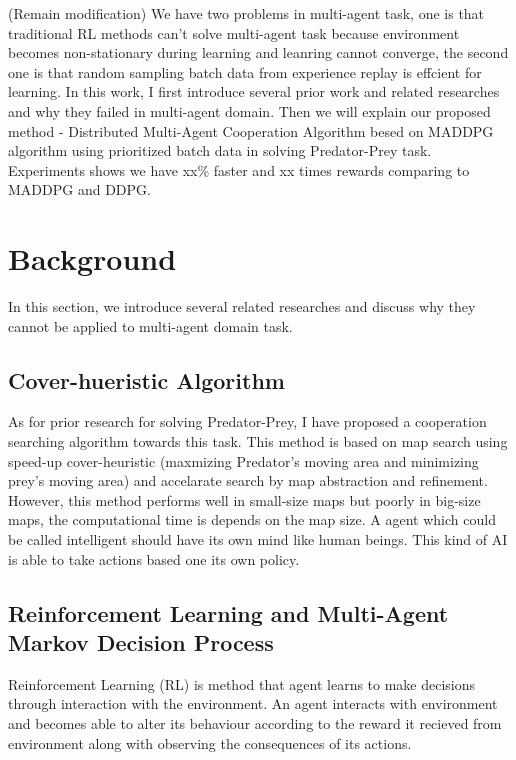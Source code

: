 \documentclass[11pt,twocolumn]{jarticle} %
\begin{document}
(Remain modification)
We have two problems in multi-agent task, one is that traditional RL methods can't solve multi-agent task because environment becomes non-stationary during learning and leanring cannot converge, the second one is that random sampling batch data from experience replay is effcient for learning. In this work, I first introduce several prior work and related researches and why they failed in multi-agent domain. Then we will explain our proposed method - Distributed Multi-Agent Cooperation Algorithm besed on MADDPG algorithm\cite{maddpg} using prioritized batch data in solving Predator-Prey task. Experiments shows we have xx\% faster and xx times rewards comparing to MADDPG and DDPG.\par

\section{Background} 
In this section, we introduce several related researches and discuss why they cannot be applied to multi-agent domain task.
\subsection{Cover-hueristic Algorithm\cite{cover}}
As for prior research for solving Predator-Prey, I have proposed a cooperation searching algorithm towards this task. This method is based on map search using speed-up cover-heuristic \cite{cover-heuristic} (maxmizing Predator's moving area and minimizing prey's moving area) and accelarate search by map abstraction and refinement. However, this method performs well in small-size maps but poorly in big-size maps, the computational time is depends on the map size. A agent which could be called intelligent should have its own mind like human beings. This kind of AI is able to take actions based one its own policy.\par


\subsection{Reinforcement Learning and Multi-Agent Markov Decision Process}

Reinforcement Learning (RL) is method that agent learns to make decisions through interaction with the environment. An agent interacts with environment and becomes able to alter its behaviour according to the reward it recieved from environment along with observing the consequences of its actions. \par
\end{document}
